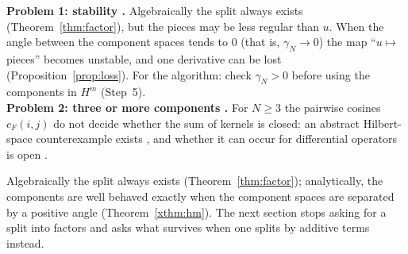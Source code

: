 \begin{caution}[title=Two problems with regularity]
\textbf{Problem 1: stability \falsest.} Algebraically the split always exists (Theorem~\ref{thm:factor}), but the pieces may be less regular than $u$. When the angle between the component spaces tends to $0$ (that is, $\gamma_N\to0$) the map ``$u\mapsto$ pieces'' becomes unstable, and one derivative can be lost (Proposition~\ref{prop:loss}). For the algorithm: check $\gamma_N>0$ before using the components in $H^m$ (Step~5).\\[3pt]
\textbf{Problem 2: three or more components \openq.} For $N\ge3$ the pairwise cosines $c_F(i,j)$ do not decide whether the sum of kernels is closed: an abstract Hilbert-space counterexample exists , and whether it can occur for differential operators is open .
\end{caution}

\begin{takeaway}
Algebraically the split always exists (Theorem~\ref{thm:factor}); analytically, the components are well behaved exactly when the component spaces are separated by a positive angle (Theorem~\ref{xthm:hm}). The next section stops asking for a split into factors and asks what survives when one splits by additive terms instead.
\end{takeaway}

